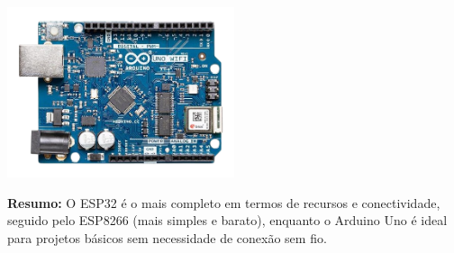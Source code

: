 \documentclass[a4paper]{article}
\begin{document}
\begin{answer}
\begin{itemize}
                \begin{center}
                    \includegraphics[width=0.5\textwidth]{images/arduino_uno.png}
                \end{center}
        \end{itemize}

        \textbf{Resumo:} O ESP32 é o mais completo em termos de recursos e conectividade, seguido pelo ESP8266 (mais simples e barato), enquanto o Arduino Uno é ideal para projetos básicos sem necessidade de conexão sem fio.
    \end{answer}
\end{document}
